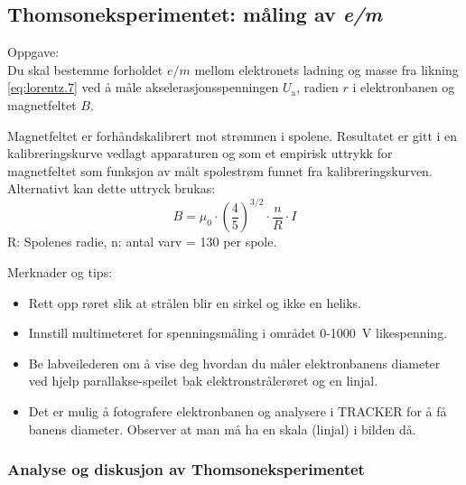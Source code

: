 \documentclass[../Elmag-labhefte-2020.tex]{subfiles}
\begin{document}
\subsection{Thomsoneksperimentet: måling av \textsl{e/m}}

Oppgave:\\
{\itsf Du skal bestemme forholdet $e/m$ mellom elektronets ladning og masse fra likning \eqref{eq:lorentz.7} ved å måle akselerasjonsspenningen $U_\mathrm{a}$, radien $r$ i elektronbanen og magnetfeltet $B$.}

Magnetfeltet er forhåndskalibrert mot strømmen i spolene. Resultatet er gitt i en kalibreringskurve vedlagt apparaturen og som et empirisk uttrykk for magnetfeltet som funksjon av målt spolestrøm funnet fra kalibreringskurven. Alternativt kan dette uttryck brukas:
\begin{equation}
    B=\mu_0 \cdot (\frac{4}{5})^{3/2}\cdot \frac{n}{R} \cdot I
\end{equation}
R: Spolenes radie, n: antal varv = 130 per spole.

Merknader og tips:
\vspace{-4mm} 
\begin{itemize}
    \item Rett opp røret slik at strålen blir en sirkel og ikke en heliks.
    \item Innstill multimeteret for spenningsmåling i området 0-\SI{1000}{\volt} likespenning.
    \item Be labveilederen om å vise deg hvordan du måler elektronbanens diameter ved hjelp parallakse-speilet bak elektronstrålerøret og en linjal.
    \item Det er mulig å fotografere elektronbanen og analysere i TRACKER for å få banens diameter. Observer at man må ha en skala (linjal) i bilden då.
\end{itemize}

\subsubsection{Analyse og diskusjon av Thomsoneksperimentet}
\end{document}
